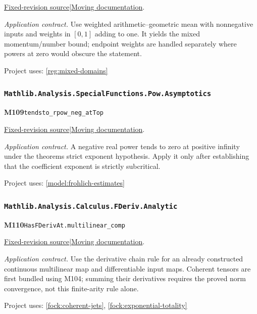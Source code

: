 \documentclass[11pt,a4paper]{article}
\theoremstyle{definition}
\theoremstyle{remark}
\begin{document}
\href{https://github.com/leanprover-community/mathlib4/blob/9bac2d0692944a775113f7c130fd5e5b4608a854/Mathlib/Analysis/MeanInequalities.lean}{Fixed-revision source}\quad|\quad\href{https://leanprover-community.github.io/mathlib4_docs/Mathlib/Analysis/MeanInequalities.html#Real.geom_mean_le_arith_mean2_weighted}{Moving documentation}.\par
\noindent\textit{Application contract.} Use weighted arithmetic--geometric mean with nonnegative inputs and weights in $[0,1]$ adding to one. It yields the mixed momentum/number bound; endpoint weights are handled separately where powers at zero would obscure the statement.\par
{\small Project uses: \ref{reg:mixed-domains}}\par\medskip

\subsubsection*{\nolinkurl{Mathlib.Analysis.SpecialFunctions.Pow.Asymptotics}}
\noindent\textbf{M109}\label{base:M109}\quad\nolinkurl{tendsto_rpow_neg_atTop}

\href{https://github.com/leanprover-community/mathlib4/blob/9bac2d0692944a775113f7c130fd5e5b4608a854/Mathlib/Analysis/SpecialFunctions/Pow/Asymptotics.lean}{Fixed-revision source}\quad|\quad\href{https://leanprover-community.github.io/mathlib4_docs/Mathlib/Analysis/SpecialFunctions/Pow/Asymptotics.html#tendsto_rpow_neg_atTop}{Moving documentation}.\par
\noindent\textit{Application contract.} A negative real power tends to zero at positive infinity under the theorem\textquotesingle s strict exponent hypothesis. Apply it only after establishing that the coefficient exponent is strictly subcritical.\par
{\small Project uses: \ref{model:frohlich-estimates}}\par\medskip

\subsubsection*{\nolinkurl{Mathlib.Analysis.Calculus.FDeriv.Analytic}}
\noindent\textbf{M110}\label{base:M110}\quad\nolinkurl{HasFDerivAt.multilinear_comp}

\href{https://github.com/leanprover-community/mathlib4/blob/9bac2d0692944a775113f7c130fd5e5b4608a854/Mathlib/Analysis/Calculus/FDeriv/Analytic.lean}{Fixed-revision source}\quad|\quad\href{https://leanprover-community.github.io/mathlib4_docs/Mathlib/Analysis/Calculus/FDeriv/Analytic.html#HasFDerivAt.multilinear_comp}{Moving documentation}.\par
\noindent\textit{Application contract.} Use the derivative chain rule for an already constructed continuous multilinear map and differentiable input maps. Coherent tensors are first bundled using M104; summing their derivatives requires the proved norm convergence, not this finite-arity rule alone.\par
{\small Project uses: \ref{fock:coherent-jets}, \ref{fock:exponential-totality}}\par\medskip
\end{document}
